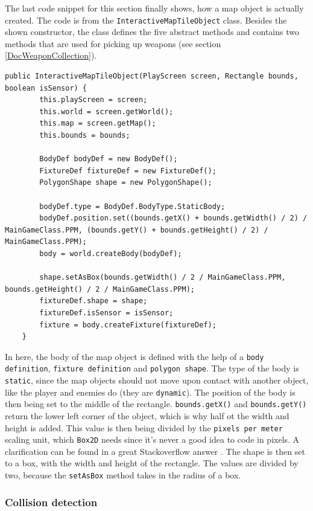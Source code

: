 \documentclass[12p]{article}
\begin{document}
The last code snippet for this section finally shows, how a map object is actually created. The code is from the \texttt{InteractiveMapTileObject} class. Besides the shown constructor, the class defines the five abstract methods and contains two methods that are used for picking up weapons (see section \ref{DocWeaponCollection}).

\begin{verbatim}
public InteractiveMapTileObject(PlayScreen screen, Rectangle bounds, boolean isSensor) {
        this.playScreen = screen;
        this.world = screen.getWorld();
        this.map = screen.getMap();
        this.bounds = bounds;

        BodyDef bodyDef = new BodyDef();
        FixtureDef fixtureDef = new FixtureDef();
        PolygonShape shape = new PolygonShape();

        bodyDef.type = BodyDef.BodyType.StaticBody;
        bodyDef.position.set((bounds.getX() + bounds.getWidth() / 2) / MainGameClass.PPM, (bounds.getY() + bounds.getHeight() / 2) / MainGameClass.PPM);
        body = world.createBody(bodyDef);

        shape.setAsBox(bounds.getWidth() / 2 / MainGameClass.PPM, bounds.getHeight() / 2 / MainGameClass.PPM);
        fixtureDef.shape = shape;
        fixtureDef.isSensor = isSensor;
        fixture = body.createFixture(fixtureDef);
    }
\end{verbatim}

In here, the body of the map object is defined with the help of a \texttt{body definition}, \texttt{fixture definition} and \texttt{polygon shape}. The type of the body is \texttt{static}, since the map objects should not move upon contact with another object, like the player and enemies do (they are \texttt{dynamic}). The position of the body is then being set to the middle of the rectangle. \texttt{bounds.getX()} and \texttt{bounds.getY()} return the lower left corner of the object, which is why half ot the width and height is added. This value is then being divided by the \texttt{pixels per meter} scaling unit, which \texttt{Box2D} needs since it's never a good idea to code in pixels. A clarification can be found in a great Stackoverflow answer \cite{stackoverflowPPM}. The shape is then set to a box, with the width and height of the rectangle. The values are divided by two, because the \texttt{setAsBox} method takes in the radius of a box.

\subsubsection{Collision detection} \label{DocCollisionDetection}
 
\end{document}
